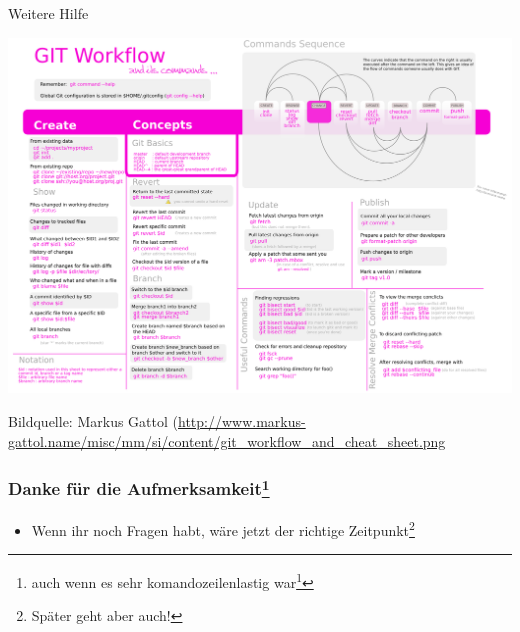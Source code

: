 \documentclass{beamer}
\begin{document}
\begin{frame}{Weitere Hilfe}
	\begin{center}
		\includegraphics[height=0.7\textheight]{git_workflow_and_cheat_sheet.png}
	\end{center}
	{\footnotesize Bildquelle: Markus Gattol (\url{http://www.markus-gattol.name/misc/mm/si/content/git_workflow_and_cheat_sheet.png}}
\end{frame}

\begin{frame}
	\frametitle{Danke für die Aufmerksamkeit\footnote{auch wenn es sehr komandozeilenlastig war\footnote{}}}
	\begin{itemize}
		\item Wenn ihr noch Fragen habt, wäre jetzt der richtige Zeitpunkt\footnote{Später geht aber auch!}
	\end{itemize}
\end{frame}
\end{document}
